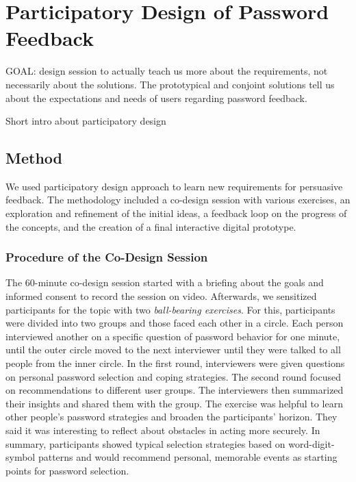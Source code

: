 \section{Participatory Design of Password Feedback}
GOAL: design session to actually teach us more about the requirements, not necessarily about the solutions. The prototypical and conjoint solutions tell us about the expectations and needs of users regarding password feedback. 


Short intro about participatory design \cite{Sanders2002ParticipatoryDesign}

\subsection{Method}
We used participatory design approach to learn new requirements for persuasive feedback. The methodology included a co-design session with various exercises, an exploration and refinement of the initial ideas, a feedback loop on the progress of the concepts, and the creation of a final interactive digital prototype.

\subsubsection{Procedure of the Co-Design Session}
The 60-minute co-design session started with a briefing about the goals and informed consent to record the session on video. Afterwards, we sensitized participants for the topic with two \textit{ball-bearing exercises}. For this, participants were divided into two groups and those faced each other in a circle. Each person interviewed another on a specific question of password behavior for one minute, until the outer circle moved to the next interviewer until they were talked to all people from the inner circle. In the first round, interviewers were given questions on personal password selection and coping strategies. The second round focused on recommendations to different user groups. The interviewers then summarized their insights and shared them with the group. The exercise was helpful to learn other people's password strategies and broaden the participants' horizon. They said it was interesting to reflect about obstacles in acting more securely. In summary, participants showed typical selection strategies based on word-digit-symbol patterns and would recommend personal, memorable events as starting points for password selection.


